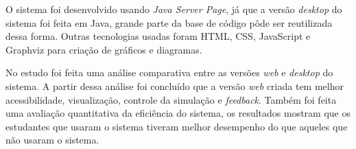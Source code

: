 O sistema foi desenvolvido usando \textit{Java Server Page}, já que a versão \textit{desktop} do sistema foi feita em Java, grande parte da base de código pôde ser reutilizada dessa forma. Outras tecnologias usadas foram HTML, CSS, JavaScript e Graphviz para criação de gráficos e diagramas.

No estudo foi feita uma análise comparativa entre as versões \textit{web} e \textit{desktop} do sistema. A partir dessa análise foi concluído que a versão \textit{web} criada tem melhor acessibilidade, visualização, controle da simulação e \textit{feedback}. Também foi feita uma avaliação quantitativa da eficiência do sistema, os resultados mostram que os estudantes que usaram o sistema tiveram melhor desempenho do que aqueles que não usaram o sistema.




